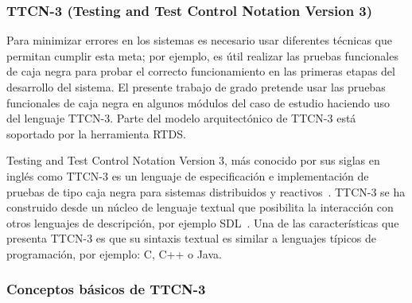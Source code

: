 \subsubsection{TTCN-3 (Testing and Test Control Notation Version 3)}


Para minimizar errores en los sistemas es necesario usar diferentes t\'ecnicas 
que permitan cumplir esta meta; por ejemplo, es \'util realizar las pruebas 
funcionales de caja negra para probar el correcto funcionamiento en las primeras 
etapas del desarrollo del sistema. El presente trabajo de grado pretende usar 
las pruebas funcionales de caja negra en algunos m\'odulos del caso de estudio 
haciendo uso del lenguaje TTCN-3. Parte del modelo arquitect\'onico de TTCN-3 
est\'a soportado por la herramienta RTDS. 

Testing and Test Control Notation Version 3, m\'as conocido por sus siglas en 
ingl\'es como TTCN-3 es un lenguaje de especificaci\'on e implementaci\'on de 
pruebas de tipo caja negra para sistemas distribuidos y 
reactivos~\cite{Grabowski2003}. TTCN-3 se ha construido desde un n\'ucleo de 
lenguaje 
textual que posibilita la interacci\'on con otros lenguajes de descripci\'on, 
por ejemplo SDL~\cite{Grabowski2003,Willcock2011}. Una de las 
caracter\'isticas que presenta TTCN-3 es que su sintaxis textual es similar a 
lenguajes t\'ipicos de programaci\'on, por ejemplo: C, C++ o Java.

\subsubsection{Conceptos b\'asicos de TTCN-3}

